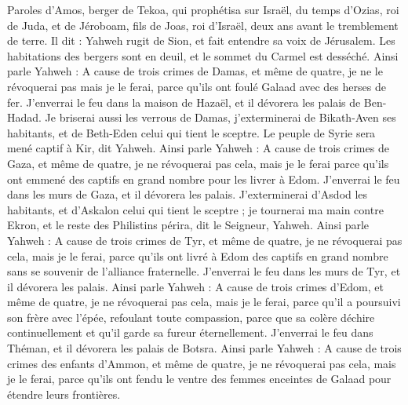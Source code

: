 \begin{multicols}{2}
\VerseOne{}Paroles d'Amos, berger de Tekoa, qui prophétisa sur Israël, du temps d’Ozias, roi de Juda, et de Jéroboam, fils de Joas, roi d'Israël, deux ans avant le tremblement de terre.
Il dit : Yahweh rugit de Sion, et fait entendre sa voix de Jérusalem. Les habitations des bergers sont en deuil, et le sommet du Carmel est desséché.
Ainsi parle Yahweh : A cause de trois crimes de Damas, et même de quatre, je ne le révoquerai pas mais je le ferai, parce qu'ils ont foulé Galaad avec des herses de fer.
J'enverrai le feu dans la maison de Hazaël, et il dévorera les palais de Ben-Hadad.
Je briserai aussi les verrous de Damas, j'exterminerai de Bikath-Aven ses habitants, et de Beth-Eden celui qui tient le sceptre. Le peuple de Syrie sera mené captif à Kir, dit Yahweh.
Ainsi parle Yahweh : A cause de trois crimes de Gaza, et même de quatre, je ne révoquerai pas cela, mais je le ferai parce qu'ils ont emmené des captifs en grand nombre pour les livrer à Edom.
J'enverrai le feu dans les murs de Gaza, et il dévorera les palais.
J'exterminerai d'Asdod les habitants, et d'Askalon celui qui tient le sceptre ; je tournerai ma main contre Ekron, et le reste des Philistins périra, dit le Seigneur, Yahweh.
Ainsi parle Yahweh : A cause de trois crimes de Tyr, et même de quatre, je ne révoquerai pas cela, mais je le ferai, parce qu'ils ont livré à Edom des captifs en grand nombre sans se souvenir de l'alliance fraternelle.
J'enverrai le feu dans les murs de Tyr, et il dévorera les palais.
Ainsi parle Yahweh : A cause de trois crimes d'Edom, et même de quatre, je ne révoquerai pas cela, mais je le ferai, parce qu'il a poursuivi son frère avec l'épée, refoulant toute compassion, parce que sa colère déchire continuellement et qu'il garde sa fureur éternellement.
J'enverrai le feu dans Théman, et il dévorera les palais de Botsra.
Ainsi parle Yahweh : A cause de trois crimes des enfants d'Ammon, et même de quatre, je ne révoquerai pas cela, mais je le ferai, parce qu’ils ont fendu le ventre des femmes enceintes de Galaad pour étendre leurs frontières.

\end{multicols}
